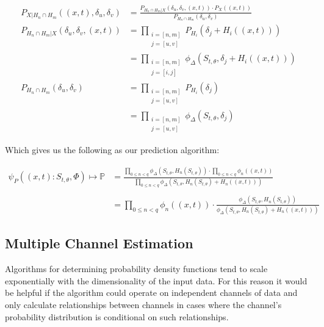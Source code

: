 \documentclass[10pt]{article}
\begin{document}
\begin{align}
P_{X|H_n \cap H_m} \left( (x,t), \delta_u, \delta_v \right) &=
	\frac { P_{H_n \cap H_m | X} \left( \delta_u, \delta_v, (x,t) \right) \cdot P_X \left( (x,t) \right) } { P_{H_n \cap H_m} \left( \delta_u, \delta_v \right) } \nonumber \\
P_{H_n \cap H_m | X} \left( \delta_u, \delta_v, (x,t) \right) &= 
	\prod_{\substack{i=[n,m] \\ j=[u,v]}} P_{H_i} \left( \delta_j + H_i((x,t)) \right) \nonumber 
\\
&= \prod_{\substack{i=[n,m]\\j=[i,j]}} \phi_\Delta(S_{t,\theta},\delta_j + H_i((x,t)) ) \\
P_{H_n \cap H_m} \left( \delta_u, \delta_v \right) &= 
	\prod_{\substack{i=[n,m]\\j=[u,v]}} P_{H_i} \left( \delta_j \right) \nonumber 
\\
&= \prod_{\substack{i=[n,m]\\j=[u,v]}} \phi_\Delta(S_{t,\theta},\delta_j )
\end{align}

Which gives us the following as our prediction algorithm:

\begin{align}
\psi_P \left( (x,t) :S_{t,\theta}, \Phi \right) \mapsto \mathbb{P} 
	&= \frac{ \prod_{0 \le n < q} \phi_\Delta \left( S_{t,\theta}, H_n(S_{t,\theta}) \right) \cdot \prod_{0 \le n < q} \phi_n \left( (x,t) \right) }{ \prod_{0 \le n < q} \phi_\Delta(S_{t,\theta}, H_n(S_{t,\theta}) + H_n((x,t)) ) }  \nonumber \\
\nonumber \\
&= \prod_{0 \le n < q} \phi_n \left( (x,t) \right) \cdot \frac{ \phi_\Delta \left (S_{t,\theta}, H_n(S_{t,\theta}) \right) }{ \phi_\Delta \left( S_{t,\theta}, H_n(S_{t,\theta}) + H_n((x,t)) \right) }
\end{align}


\subsection{Multiple Channel Estimation}
Algorithms for determining probability density functions tend to scale exponentially with the dimensionality of the input data.  For this reason it would be helpful if the algorithm could operate on independent channels of data and only calculate relationships between channels in cases where the channel's probability distribution is conditional on such relationships.
\end{document}
